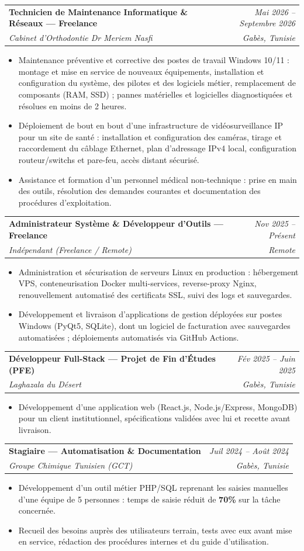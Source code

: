 \documentclass[letterpaper,9pt]{article}
\makeatletter
\newcommand{\resumeItem}[1]{\item\small{#1}}
\newcommand{\resumeSubheading}[4]{
  \vspace{-1pt}\item
  \begin{tabular*}{0.97\textwidth}[t]{l@{\extracolsep{\fill}}r}
    \textbf{#1} & \textit{\color{greytext}#2} \\
    \textit{\small\color{greytext} #3} & \textit{\small\color{greytext} #4}
  \end{tabular*}\vspace{-2pt}
}
\newcommand{\resumeItemListStart}{\begin{itemize}[leftmargin=0.24in, label={}, itemsep=0.9pt, topsep=1.2pt, parsep=0pt]}
\newcommand{\resumeItemListEnd}{\end{itemize}\vspace{-2pt}}
\makeatother
\begin{document}
  \resumeSubheading{Technicien de Maintenance Informatique \& Réseaux --- Freelance}{Mai 2026 -- Septembre 2026}{Cabinet d'Orthodontie Dr Meriem Nasfi}{Gabès, Tunisie}
    \resumeItemListStart
      \resumeItem{Maintenance préventive et corrective des postes de travail Windows 10/11 : montage et mise en service de nouveaux équipements, installation et configuration du système, des pilotes et des logiciels métier, remplacement de composants (RAM, SSD) ; pannes matérielles et logicielles diagnostiquées et résolues en moins de 2 heures.}
      \resumeItem{Déploiement de bout en bout d'une infrastructure de vidéosurveillance IP pour un site de santé : installation et configuration des caméras, tirage et raccordement du câblage Ethernet, plan d'adressage IPv4 local, configuration routeur/switchs et pare-feu, accès distant sécurisé.}
      \resumeItem{Assistance et formation d'un personnel médical non-technique : prise en main des outils, résolution des demandes courantes et documentation des procédures d'exploitation.}
    \resumeItemListEnd

  \resumeSubheading{Administrateur Système \& Développeur d'Outils --- Freelance}{Nov 2025 -- Présent}{Indépendant (Freelance / Remote)}{Remote}
    \resumeItemListStart
      \resumeItem{Administration et sécurisation de serveurs Linux en production : hébergement VPS, conteneurisation Docker multi-services, reverse-proxy Nginx, renouvellement automatisé des certificats SSL, suivi des logs et sauvegardes.}
      \resumeItem{Développement et livraison d'applications de gestion déployées sur postes Windows (PyQt5, SQLite), dont un logiciel de facturation avec sauvegardes automatisées ; déploiements automatisés via GitHub Actions.}
    \resumeItemListEnd

  \resumeSubheading{Développeur Full-Stack --- Projet de Fin d'Études (PFE)}{Fév 2025 -- Juin 2025}{Laghazala du Désert}{Gabès, Tunisie}
    \resumeItemListStart
      \resumeItem{Développement d'une application web (React.js, Node.js/Express, MongoDB) pour un client institutionnel, spécifications validées avec lui et recette avant livraison.}
    \resumeItemListEnd

  \resumeSubheading{Stagiaire --- Automatisation \& Documentation}{Juil 2024 -- Août 2024}{Groupe Chimique Tunisien (GCT)}{Gabès, Tunisie}
    \resumeItemListStart
      \resumeItem{Développement d'un outil métier PHP/SQL reprenant les saisies manuelles d'une équipe de 5 personnes : temps de saisie réduit de \textbf{70\%} sur la tâche concernée.}
      \resumeItem{Recueil des besoins auprès des utilisateurs terrain, tests avec eux avant mise en service, rédaction des procédures internes et du guide d'utilisation.}
    \resumeItemListEnd
\end{document}

